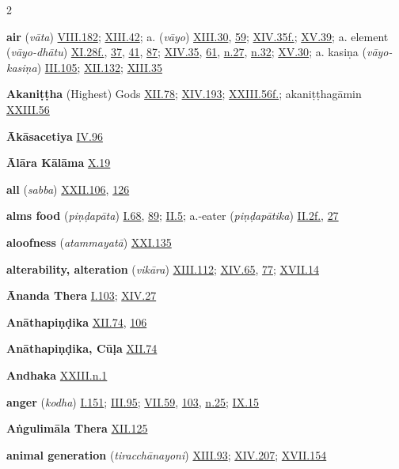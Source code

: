 \begin{multicols}{2}
\begin{vismHanging}
\par\textbf{air} (\emph{vāta}) \hyperlink{VIII.182}{VIII.182}{}; \hyperlink{XIII.42}{XIII.42}{}; a. (\emph{vāyo}) \hyperlink{XIII.30}{XIII.30}{}, \hyperlink{XIII.59}{59}{}; \hyperlink{XIV.35}{XIV.35f.}{}; \hyperlink{XV.39}{XV.39}{}; a. element (\emph{vāyo-dhātu}) \hyperlink{XI.28}{XI.28f.}{}, \hyperlink{XI.37}{37}{}, \hyperlink{XI.41}{41}{}, \hyperlink{XI.87}{87}{}; \hyperlink{XIV.35}{XIV.35}{}, \hyperlink{XIV.61}{61}{}, \hyperlink{XIV.n27}{n.27}{}, \hyperlink{XIV.n32}{n.32}{}; \hyperlink{XV.30}{XV.30}{}; a. kasiṇa (\emph{vāyo-kasiṇa}) \hyperlink{III.105}{III.105}{}; \hyperlink{XII.132}{XII.132}{}; \hyperlink{XIII.35}{XIII.35}{}
\par\textbf{Akaniṭṭha} (Highest) Gods \hyperlink{XII.78}{XII.78}{}; \hyperlink{XIV.193}{XIV.193}{}; \hyperlink{XXIII.56}{XXIII.56f.}{}; akaniṭṭhagāmin \hyperlink{XXIII.56}{XXIII.56}{}
\par\textbf{Ākāsacetiya} \hyperlink{IV.96}{IV.96}{}
\par\textbf{Ālāra Kālāma} \hyperlink{X.19}{X.19}{}
\par\textbf{all} (\emph{sabba}) \hyperlink{XXII.106}{XXII.106}{}, \hyperlink{XXII.126}{126}{}
\par\textbf{alms food} (\emph{piṇḍapāta}) \hyperlink{I.68}{I.68}{}, \hyperlink{I.89}{89}{}; \hyperlink{II.5}{II.5}{}; a.-eater (\emph{piṇḍapātika}) \hyperlink{II.2}{II.2f.}{}, \hyperlink{II.27}{27}{}
\par\textbf{aloofness} (\emph{atammayatā}) \hyperlink{XXI.135}{XXI.135}{}
\par\textbf{alterability, alteration} (\emph{vikāra}) \hyperlink{XIII.112}{XIII.112}{}; \hyperlink{XIV.65}{XIV.65}{}, \hyperlink{XIV.77}{77}{}; \hyperlink{XVII.14}{XVII.14}{}
\par\textbf{Ānanda Thera} \hyperlink{I.103}{I.103}{}; \hyperlink{XIV.27}{XIV.27}{}
\par\textbf{Anāthapiṇḍika} \hyperlink{XII.74}{XII.74}{}, \hyperlink{XII.106}{106}{}
\par\textbf{Anāthapiṇḍika, Cūḷa} \hyperlink{XII.74}{XII.74}{}
\par\textbf{Andhaka} \hyperlink{XXIII.n1}{XXIII.n.1}{}
\par\textbf{anger} (\emph{kodha}) \hyperlink{I.151}{I.151}{}; \hyperlink{III.95}{III.95}{}; \hyperlink{VII.59}{VII.59}{}, \hyperlink{VII.103}{103}{}, \hyperlink{VII.n25}{n.25}{}; \hyperlink{IX.15}{IX.15}{}
\par\textbf{Aṅgulimāla Thera} \hyperlink{XII.125}{XII.125}{}
\par\textbf{animal generation} (\emph{tiracchānayoni}) \hyperlink{XIII.93}{XIII.93}{}; \hyperlink{XIV.207}{XIV.207}{}; \hyperlink{XVII.154}{XVII.154}{}

\end{vismHanging}
\end{multicols}
